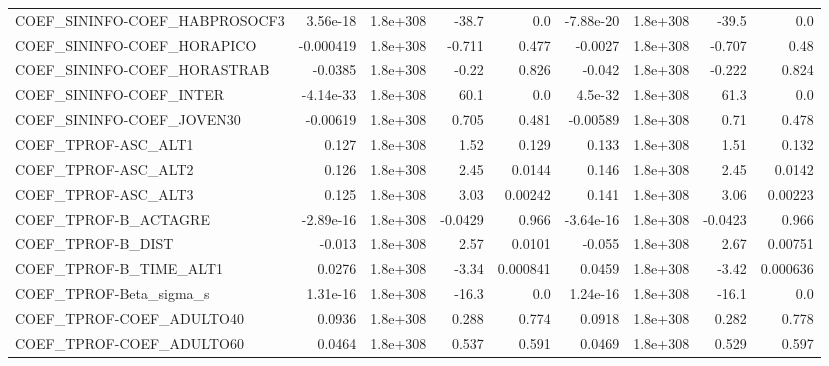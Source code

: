 \begin{tabular}{lrrrrrrrr}
COEF\_SININFO-COEF\_HABPROSOCF3     &    3.56e-18 &     1.8e+308 &     -38.7 &      0.0 &  -7.88e-20 &    1.8e+308 &        -39.5 &           0.0 \\
COEF\_SININFO-COEF\_HORAPICO        &   -0.000419 &     1.8e+308 &    -0.711 &    0.477 &    -0.0027 &    1.8e+308 &       -0.707 &          0.48 \\
COEF\_SININFO-COEF\_HORASTRAB       &     -0.0385 &     1.8e+308 &     -0.22 &    0.826 &     -0.042 &    1.8e+308 &       -0.222 &         0.824 \\
COEF\_SININFO-COEF\_INTER           &   -4.14e-33 &     1.8e+308 &      60.1 &      0.0 &    4.5e-32 &    1.8e+308 &         61.3 &           0.0 \\
COEF\_SININFO-COEF\_JOVEN30         &    -0.00619 &     1.8e+308 &     0.705 &    0.481 &   -0.00589 &    1.8e+308 &         0.71 &         0.478 \\
COEF\_TPROF-ASC\_ALT1               &       0.127 &     1.8e+308 &      1.52 &    0.129 &      0.133 &    1.8e+308 &         1.51 &         0.132 \\
COEF\_TPROF-ASC\_ALT2               &       0.126 &     1.8e+308 &      2.45 &   0.0144 &      0.146 &    1.8e+308 &         2.45 &        0.0142 \\
COEF\_TPROF-ASC\_ALT3               &       0.125 &     1.8e+308 &      3.03 &  0.00242 &      0.141 &    1.8e+308 &         3.06 &       0.00223 \\
COEF\_TPROF-B\_ACTAGRE              &   -2.89e-16 &     1.8e+308 &   -0.0429 &    0.966 &  -3.64e-16 &    1.8e+308 &      -0.0423 &         0.966 \\
COEF\_TPROF-B\_DIST                 &      -0.013 &     1.8e+308 &      2.57 &   0.0101 &     -0.055 &    1.8e+308 &         2.67 &       0.00751 \\
COEF\_TPROF-B\_TIME\_ALT1            &      0.0276 &     1.8e+308 &     -3.34 & 0.000841 &     0.0459 &    1.8e+308 &        -3.42 &      0.000636 \\
COEF\_TPROF-Beta\_sigma\_s           &    1.31e-16 &     1.8e+308 &     -16.3 &      0.0 &   1.24e-16 &    1.8e+308 &        -16.1 &           0.0 \\
COEF\_TPROF-COEF\_ADULTO40          &      0.0936 &     1.8e+308 &     0.288 &    0.774 &     0.0918 &    1.8e+308 &        0.282 &         0.778 \\
COEF\_TPROF-COEF\_ADULTO60          &      0.0464 &     1.8e+308 &     0.537 &    0.591 &     0.0469 &    1.8e+308 &        0.529 &         0.597 \\

\end{tabular}
